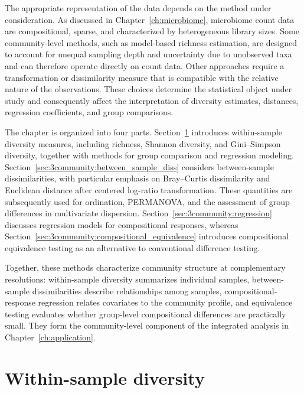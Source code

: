 The appropriate representation of the data depends on the method under consideration. As discussed in Chapter~\ref{ch:microbiome}, microbiome count data are compositional, sparse, and characterized by heterogeneous library sizes. Some community-level methods, such as model-based richness estimation, are designed to account for unequal sampling depth and uncertainty due to unobserved taxa and can therefore operate directly on count data. Other approaches require a transformation or dissimilarity measure that is compatible with the relative nature of the observations. These choices determine the statistical object under study and consequently affect the interpretation of diversity estimates, distances, regression coefficients, and group comparisons.

The chapter is organized into four parts. Section~\ref{sec:3community:within_sample_div} introduces within-sample diversity measures, including richness, Shannon diversity, and Gini--Simpson diversity, together with methods for group comparison and regression modeling. Section~\ref{sec:3community:between_sample_diss} considers between-sample dissimilarities, with particular emphasis on Bray--Curtis dissimilarity and Euclidean distance after centered log-ratio transformation. These quantities are subsequently used for ordination, PERMANOVA, and the assessment of group differences in multivariate dispersion. Section~\ref{sec:3community:regression} discusses regression models for compositional responses, whereas Section~\ref{sec:3community:compositional_equivalence} introduces compositional equivalence testing as an alternative to conventional difference testing.

Together, these methods characterize community structure at complementary resolutions: within-sample diversity summarizes individual samples, between-sample dissimilarities describe relationships among samples, compositional-response regression relates covariates to the community profile, and equivalence testing evaluates whether group-level compositional differences are practically small. They form the community-level component of the integrated analysis in Chapter~\ref{ch:application}.


\section{Within-sample diversity}
\label{sec:3community:within_sample_div}


